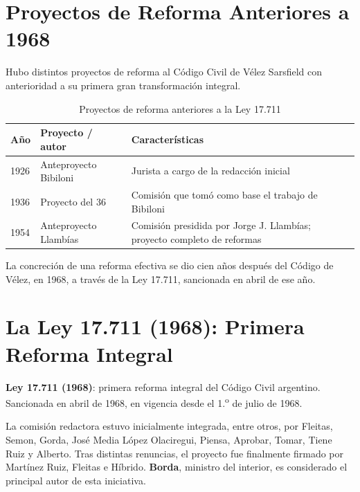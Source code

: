 \documentclass[12pt,oneside]{book}
\begin{document}
\section{Proyectos de Reforma Anteriores a 1968}

Hubo distintos proyectos de reforma al Código Civil de Vélez Sarsfield con anterioridad a su primera gran transformación integral.

\begin{table}[H]
\centering
\begin{tabular}{@{}p{}p{}p{}@{}}
\toprule
\textbf{Año} & \textbf{Proyecto / autor} & \textbf{Características} \\
\midrule
1926 & Anteproyecto Bibiloni & Jurista a cargo de la redacción inicial \\
1936 & Proyecto del 36 & Comisión que tomó como base el trabajo de Bibiloni \\
1954 & Anteproyecto Llambías & Comisión presidida por Jorge J. Llambías; proyecto completo de reformas \\
\bottomrule
\end{tabular}
\caption{Proyectos de reforma anteriores a la Ley 17.711}
\end{table}

La concreción de una reforma efectiva se dio cien años después del Código de Vélez, en 1968, a través de la Ley 17.711, sancionada en abril de ese año.

\section{La Ley 17.711 (1968): Primera Reforma Integral}

\begin{important}
\textbf{Ley 17.711 (1968)}: primera reforma integral del Código Civil argentino. Sancionada en abril de 1968, en vigencia desde el 1.\textsuperscript{o} de julio de 1968.
\end{important}

La comisión redactora estuvo inicialmente integrada, entre otros, por Fleitas, Semon, Gorda, José Media López Olaciregui, Piensa, Aprobar, Tomar, Tiene Ruiz y Alberto.
Tras distintas renuncias, el proyecto fue finalmente firmado por Martínez Ruiz, Fleitas e Híbrido. \textbf{Borda}, ministro del interior, es considerado el principal autor de esta iniciativa.
\end{document}

